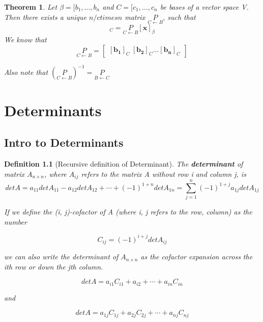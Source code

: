 \documentclass[12pt]{report}
\newtheorem{thm}{Theorem}
\newtheorem{dfn}{Definition}
\newcommand{\mtx}[3]{$#1_{#2\times #3}$}
\begin{document}
\begin{thm}

Let $\beta = [b_1, \ldots, b_n$ and $C = [c_1, \ldots, c_n$ be bases of a vector space V. Then there exists a unique $n /ctimes n$ matrix $\underset{C\gets B}{P}$, such that
\begin{equation}
[\bm{x}]_C = \underset{C\gets B}{P}[\bm{x}]_\beta
\end{equation}
We know that 
\begin{equation}
\underset{C\gets B}{P} = \begin{bmatrix} [\bm{b_1}]_C \: [\bm{b_2}]_C \ldots [\bm{b_n}]_C \end{bmatrix}
\end{equation}

Also note that $(\underset{C\gets B}{P})^{-1}=\underset{B\gets C}{P}$

\end{thm}

\chapter{Determinants}

\section{Intro to Determinants}

\begin{dfn}[Recursive definition of Determinant]

The \textbf{determinant} of matrix \mtx{A}{n}{n}, where $A_{ij}$ refers to the matrix A without row i and column j, is
\begin{equation}
det A = a_{11}det A_{11} - a_{12}det A_{12} + \cdots + (-1)^{1+n}det A_{1n} = \sum_{j=1}^{n}(-1)^{1+j}a_{1j}det A_{1j}
\end{equation}

If we define the (i, j)-cofactor of A (where i, j refers to the row, column) as the number

\begin{equation}
C_{ij} = (-1)^{i+j}det A_{ij}
\end{equation}

we can also write the determinant of \mtx{A}{n}{n} as the cofactor expansion across the ith row or down the jth column.

\begin{equation}
det A = a_{i1}C_{i1} + a_{i2} + \cdots + a_{in}C_{in}
\end{equation}

and 

\begin{equation}
det A = a_{1j}C_{1j} + a_{2j}C_{2j} + \cdots + a_{nj}C_{nj}
\end{equation}

\end{dfn}
\end{document}
